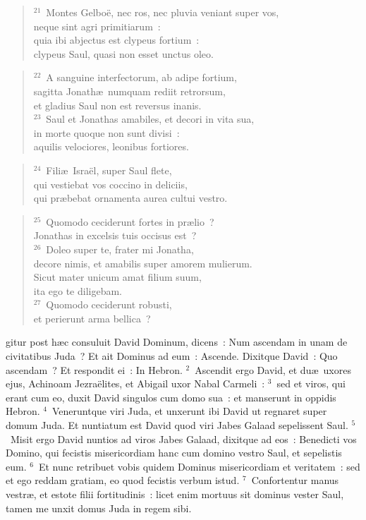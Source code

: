 \begin{verse}${}^{21}$~Montes Gelbo\"e, nec ros, nec pluvia veniant super vos,\\ neque sint agri primitiarum~:\\ quia ibi abjectus est clypeus fortium~:\\ clypeus Saul, quasi non esset unctus oleo.\end{verse}


\begin{verse}${}^{22}$~A sanguine interfectorum, ab adipe fortium,\\ sagitta Jonath\ae\ numquam rediit retrorsum,\\ et gladius Saul non est reversus inanis.\\
${}^{23}$~Saul et Jonathas amabiles, et decori in vita sua,\\ in morte quoque non sunt divisi~:\\ aquilis velociores, leonibus fortiores.\end{verse}


\begin{verse}${}^{24}$~Fili\ae\ Isra\"el, super Saul flete,\\ qui vestiebat vos coccino in deliciis,\\ qui pr\ae bebat ornamenta aurea cultui vestro.\end{verse}


\begin{verse}${}^{25}$~Quomodo ceciderunt fortes in pr\ae lio~?\\ Jonathas in excelsis tuis occisus est~?\\
${}^{26}$~Doleo super te, frater mi Jonatha,\\ decore nimis, et amabilis super amorem mulierum.\\ Sicut mater unicum amat filium suum,\\ ita ego te diligebam.\\
${}^{27}$~Quomodo ceciderunt robusti,\\ et perierunt arma bellica~?\end{verse}



\bchapter
{}gitur post h\ae c consuluit David Dominum, dicens~: Num ascendam in unam de civitatibus Juda~? Et ait Dominus ad eum~: Ascende. Dixitque David~: Quo ascendam~? Et respondit ei~: In Hebron.
${}^{2}$~Ascendit ergo David, et du\ae\ uxores ejus, Achinoam Jezra\"elites, et Abigail uxor Nabal Carmeli~:
${}^{3}$~sed et viros, qui erant cum eo, duxit David singulos cum domo sua~: et manserunt in oppidis Hebron.
${}^{4}$~Veneruntque viri Juda, et unxerunt ibi David ut regnaret super domum Juda. Et nuntiatum est David quod viri Jabes Galaad sepelissent Saul.
${}^{5}$~Misit ergo David nuntios ad viros Jabes Galaad, dixitque ad eos~: Benedicti vos Domino, qui fecistis misericordiam hanc cum domino vestro Saul, et sepelistis eum.
${}^{6}$~Et nunc retribuet vobis quidem Dominus misericordiam et veritatem~: sed et ego reddam gratiam, eo quod fecistis verbum istud.
${}^{7}$~Confortentur manus vestr\ae , et estote filii fortitudinis~: licet enim mortuus sit dominus vester Saul, tamen me unxit domus Juda in regem sibi.


